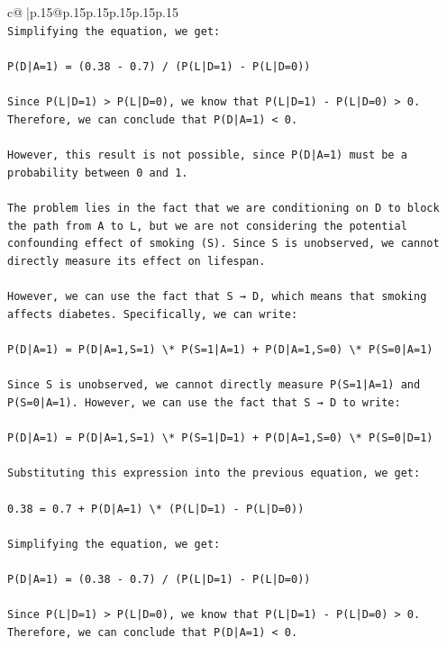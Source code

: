 \documentclass{article}
\begin{document}
{\begin{supertabular}{c@{$\;$}|p{.15\linewidth}@{}p{.15\linewidth}p{.15\linewidth}p{.15\linewidth}p{.15\linewidth}p{.15\linewidth}}
{{{\\ 
\texttt{Simplifying the equation, we get:} \\
\\ 
\texttt{P(D|A=1) = (0.38 {-} 0.7) / (P(L|D=1) {-} P(L|D=0))} \\
\\ 
\texttt{Since P(L|D=1) > P(L|D=0), we know that P(L|D=1) {-} P(L|D=0) > 0. Therefore, we can conclude that P(D|A=1) < 0.} \\
\\ 
\texttt{However, this result is not possible, since P(D|A=1) must be a probability between 0 and 1.} \\
\\ 
\texttt{The problem lies in the fact that we are conditioning on D to block the path from A to L, but we are not considering the potential confounding effect of smoking (S). Since S is unobserved, we cannot directly measure its effect on lifespan.} \\
\\ 
\texttt{However, we can use the fact that S → D, which means that smoking affects diabetes. Specifically, we can write:} \\
\\ 
\texttt{P(D|A=1) = P(D|A=1,S=1) \textbackslash{}* P(S=1|A=1) + P(D|A=1,S=0) \textbackslash{}* P(S=0|A=1)} \\
\\ 
\texttt{Since S is unobserved, we cannot directly measure P(S=1|A=1) and P(S=0|A=1). However, we can use the fact that S → D to write:} \\
\\ 
\texttt{P(D|A=1) = P(D|A=1,S=1) \textbackslash{}* P(S=1|D=1) + P(D|A=1,S=0) \textbackslash{}* P(S=0|D=1)} \\
\\ 
\texttt{Substituting this expression into the previous equation, we get:} \\
\\ 
\texttt{0.38 = 0.7 + P(D|A=1) \textbackslash{}* (P(L|D=1) {-} P(L|D=0))} \\
\\ 
\texttt{Simplifying the equation, we get:} \\
\\ 
\texttt{P(D|A=1) = (0.38 {-} 0.7) / (P(L|D=1) {-} P(L|D=0))} \\
\\ 
\texttt{Since P(L|D=1) > P(L|D=0), we know that P(L|D=1) {-} P(L|D=0) > 0. Therefore, we can conclude that P(D|A=1) < 0.} \\
}}}
\end{supertabular}}
\end{document}
